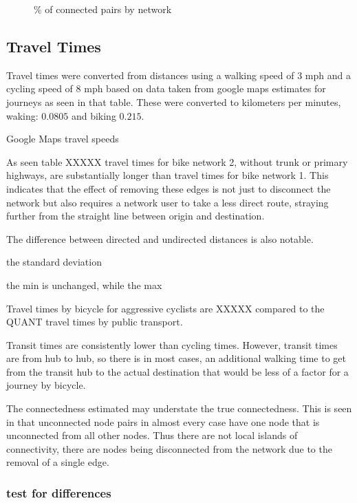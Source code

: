 \begin{figure}
\centering
\caption{\% of connected pairs by network}
\label{fig:connected_pairs}
\end{figure}

\subsection{Travel Times}

Travel times were converted from distances using a walking speed of 3 mph and a cycling speed of 8 mph based on data taken from google maps estimates for journeys as seen in that table. These were converted to kilometers per minutes, waking: $0.0805$ and biking $0.215$. 

\begin{table}
\centering
\caption{Google Maps travel speeds}
\label{table:travel_speeds}
\end{table}

As seen table XXXXX travel times for bike network 2, without trunk or primary highways, are substantially longer than travel times for bike network 1. This indicates that the effect of removing these edges is not just to disconnect the network but also requires a network user to take a less direct route, straying further from the straight line between origin and destination. 

The difference between directed and undirected distances is also notable. 

the standard deviation 

the min is unchanged, while the max 

Travel times by bicycle for aggressive cyclists are XXXXX compared to the QUANT travel times by public transport. 


Transit times are consistently lower than cycling times. However, transit times are from hub to hub, so there is in most cases, an additional walking time to get from the transit hub to the actual destination that would be less of a factor for a journey by bicycle. 


The connectedness estimated may understate the true connectedness. This is seen in that unconnected node pairs in almost every case have one node that is unconnected from all other nodes. Thus there are not local islands of connectivity, there are nodes being disconnected from the network due to the removal of a single edge. 




\subsubsection{test for differences}


